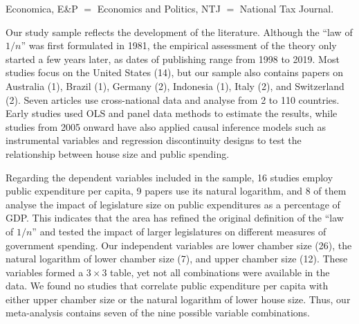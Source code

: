 \documentclass[11pt,a4paper,]{article}
\begin{document}
\begin{longtable}
\begin{minipage}{\textwidth}
{Economica, E\&P $=$ Economics and Politics, NTJ $=$ National Tax Journal.}
\end{minipage} 
\end{longtable}
\normalsize

Our study sample reflects the development of the literature. Although
the ``law of \(1/n\)'' was first formulated in 1981, the empirical
assessment of the theory only started a few years later, as dates of
publishing range from 1998 to 2019. Most studies focus on the United
States (14), but our sample also contains papers on Australia (1),
Brazil (1), Germany (2), Indonesia (1), Italy (2), and Switzerland (2).
Seven articles use cross-national data and analyse from 2 to 110
countries. Early studies used OLS and panel data methods to estimate the
results, while studies from 2005 onward have also applied causal
inference models such as instrumental variables and regression
discontinuity designs to test the relationship between house size and
public spending.

Regarding the dependent variables included in the sample, 16 studies
employ public expenditure per capita, 9 papers use its natural
logarithm, and 8 of them analyse the impact of legislature size on
public expenditures as a percentage of GDP. This indicates that the area
has refined the original definition of the ``law of \(1/n\)'' and tested
the impact of larger legislatures on different measures of government
spending. Our independent variables are lower chamber size (26), the
natural logarithm of lower chamber size (7), and upper chamber size
(12). These variables formed a \(3 \times 3\) table, yet not all
combinations were available in the data. We found no studies that
correlate public expenditure per capita with either upper chamber size
or the natural logarithm of lower house size. Thus, our meta-analysis
contains seven of the nine possible variable combinations.
\end{document}
